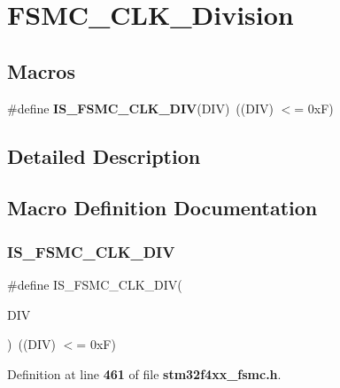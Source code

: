 \section{F\+S\+M\+C\+\_\+\+C\+L\+K\+\_\+\+Division}
\label{group__FSMC__CLK__Division}
\subsection*{Macros}
\begin{DoxyCompactItemize}
\item 
\#define \textbf{ I\+S\+\_\+\+F\+S\+M\+C\+\_\+\+C\+L\+K\+\_\+\+D\+IV}(D\+IV)~((D\+IV) $<$= 0x\+F)
\end{DoxyCompactItemize}


\subsection{Detailed Description}


\subsection{Macro Definition Documentation}
\mbox{\label{group__FSMC__CLK__Division_ga9e5321b02ea049fd076ba705acd06b5f}} 
\subsubsection{I\+S\+\_\+\+F\+S\+M\+C\+\_\+\+C\+L\+K\+\_\+\+D\+IV}
{\footnotesize\ttfamily \#define I\+S\+\_\+\+F\+S\+M\+C\+\_\+\+C\+L\+K\+\_\+\+D\+IV(\begin{DoxyParamCaption}\item[{}]{D\+IV }\end{DoxyParamCaption})~((D\+IV) $<$= 0x\+F)}



Definition at line \textbf{ 461} of file \textbf{ stm32f4xx\+\_\+fsmc.\+h}.

